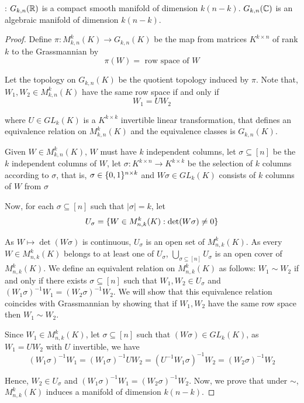 \begin{proposition}:
	$G_{k, n}(\mathbb{R})$ is a compact smooth manifold of dimension $k(n-k)$. $G_{k, n}(\mathbb{C})$ is an algebraic manifold of dimension $k(n-k)$.
	\begin{proof}
		Define $\pi: M_{k, n}^k(K) \to G_{k, n}(K)$ be the map from matrices $K^{k \times n}$ of rank $k$ to the Grassmannian by
		$$
		\pi(W) = \text{ row space of } W
		$$
		
		Let the topology on $G_{k, n}(K)$ be the quotient topology induced by $\pi$. Note that, $W_1, W_2 \in M_{k, n}^k(K)$ have the same row space if and only if 
		$$
		W_1 = U W_2
		$$
		
		where $U \in GL_k(K)$ is a $K^{k \times k}$ invertible linear transformation, that defines an equivalence relation on $M_{k, n}^k(K)$ and the equivalence classes is $G_{k, n}(K)$.
		
		
		Given $W \in M_{k, n}^k(K)$, $W$ must have $k$ independent columns, let $\sigma \subseteq [n]$ be the $k$ independent columns of $W$, let $\sigma: K^{k \times n} \to K^{k \times k}$ be the selection of $k$ columns according to $\sigma$, that is, $\sigma \in \{0, 1\}^{n \times k}$ and $W \sigma \in GL_k(K)$ consists of $k$ columns of $W$ from $\sigma$
		
		Now, for each $\sigma \subseteq [n]$ such that $|\sigma| = k$, let
		$$
		U_\sigma = \{W \in M_{n, k}^k(K): \det (W \sigma) \neq 0\}
		$$
		
		As $W \mapsto \det(W \sigma)$ is continuous, $U_\sigma$ is an open set of $M_{n, k}^k(K)$. As every $W \in M_{n, k}^k(K)$ belongs to at least one of $U_\sigma$, $\bigcup_{\sigma \subseteq [n]} U_\sigma$ is an open cover of $M_{n, k}^k(K)$. We define an equivalent relation on $M_{n, k}^k(K)$ as follows: $W_1 \sim W_2$ if and only if there exists $\sigma \subseteq [n]$ such that $W_1, W_2 \in U_\sigma$ and $(W_1 \sigma)^{-1} W_1 = (W_2 \sigma)^{-1} W_2$. We will show that this equivalence relation coincides with Grassmannian by showing that if $W_1, W_2$ have the same row space then $W_1 \sim W_2$.
		
		Since $W_1 \in M_{n, k}^k(K)$, let $\sigma \subseteq [n]$ such that $(W \sigma) \in GL_k(K)$, as $W_1 = U W_2$ with $U$ invertible, we have
		$$
		(W_1 \sigma)^{-1} W_1 = (W_1 \sigma)^{-1} U W_2 = (U^{-1} W_1 \sigma)^{-1} W_2 = (W_2 \sigma)^{-1} W_2
		$$
		
		Hence, $W_2 \in U_\sigma$ and $(W_1 \sigma)^{-1} W_1 = (W_2 \sigma)^{-1} W_2$. Now, we prove that under $\sim$, $M_{n, k}^k(K)$ induces a manifold of dimension $k(n-k)$.
		

\end{proof}
\end{proposition}
